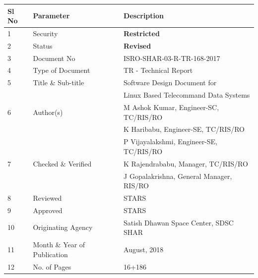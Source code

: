 \documentclass[a4paper, 12pt, oneside]{Thesis}  %
\begin{document}
	\begin{table}[h]
		\centering
		\label{TAB:Certificate}
		\begin{tabular}{@{}lll@{}}
			\toprule
			\textbf{Sl No} & \textbf{Parameter}           & \textbf{Description}                           \\ \midrule
			1              & Security                     & \textbf{Restricted}                            \\
			2              & Status                       & \textbf{Revised}                                   \\
			3              & Document No                  & ISRO-SHAR-03-R-TR-168-2017                              \\
			4              & Type of Document             & TR - Technical Report                          \\
			5              & Title \& Sub-title           & Software Design Document for \\
			&                              & Linux Based Telecommand Data Systems           \\
			6              & Author(s)                    & M Ashok Kumar, Engineer-SC, TC/RIS/RO \newline    \\
			&                              & K Haribabu, Engineer-SE, TC/RIS/RO           \\
			&                              & P Vijayalakshmi, Engineer-SE, TC/RIS/RO           \\
			7              & Checked $\&$ Verified   & K Rajendrababu, Manager, TC/RIS/RO           \\                  
			& & J Gopalakrishna, General Manager, RIS/RO      \\
			8              & Reviewed                     & STARS                                          \\
			9              & Approved                     & STARS                                          \\
			10             & Originating Agency           & Satish Dhawan Space Center, SDSC SHAR          \\
			11             & Month \& Year of Publication & August, 2018                                  \\
			12             & No. of Pages                 & 16+186                                             \\

\end{tabular}
\end{table}
\end{document}
